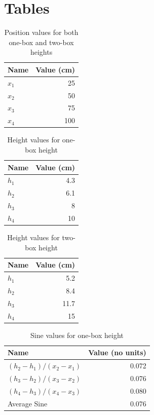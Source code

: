 \section{Tables}
%
\begin{table}[ht]
    \centering
    \begin{tabular}{|l|r|}
        \hline
        Name & Value (cm) \\
        \hline
        $x_{1}$ & 25 \\
        $x_{2}$ & 50 \\
        $x_{3}$ & 75 \\
        $x_{4}$ & 100 \\
        \hline
    \end{tabular}
    \caption{Position values for both one-box and two-box heights}
    \label{table:07.x}
\end{table}
%
\begin{table}[ht]
    \centering
    \begin{tabular}{|l|r|}
        \hline
        Name & Value (cm) \\
        \hline
        $h_{1}$ & 4.3 \\
        $h_{2}$ & 6.1 \\
        $h_{3}$ & 8 \\
        $h_{4}$ & 10 \\
        \hline
    \end{tabular}
    \caption{Height values for one-box height}
    \label{table:07.h.1}
\end{table}
%
\begin{table}[ht]
    \centering
    \begin{tabular}{|l|r|}
        \hline
        Name & Value (cm) \\
        \hline
        $h_{1}$ & 5.2 \\
        $h_{2}$ & 8.4 \\
        $h_{3}$ & 11.7 \\
        $h_{4}$ & 15 \\
        \hline
    \end{tabular}
    \caption{Height values for two-box height}
    \label{table:07.h.2}
\end{table}
%
\begin{table}[ht]
    \centering
    \begin{tabular}{|l|r|}
        \hline
        Name & Value (no units) \\
        \hline
        $\left( h_{2} - h_{1} \right) / \left( x_{2} - x_{1} \right)$ & 0.072 \\
        $\left( h_{3} - h_{2} \right) / \left( x_{3} - x_{2} \right)$ & 0.076 \\
        $\left( h_{4} - h_{3} \right) / \left( x_{4} - x_{3} \right)$ & 0.080 \\
        \hline
        Average Sine & 0.076 \\
        \hline
    \end{tabular}
    \caption{Sine values for one-box height}
    \label{table:07.sine.1}
\end{table}
